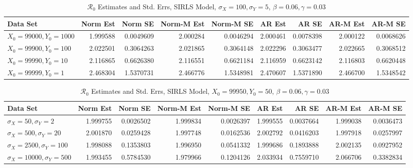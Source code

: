 \message{ !name(draft_v13.tex)}\documentclass[12pt]{article}
\newcommand{\rr}{\ensuremath{\mathcal{R}_0}}
\begin{document}
\begin{table}[H]
	
	\caption{\label{tab:}$\rr$ Estimates and Std. Errs, SIRLS Model,
		$\sigma_X = 100, \sigma_Y = 5$, $\beta = 0.06, \gamma = 0.03$}
	\centering
	\begin{footnotesize}
		\begin{tabular}[t]{l|r|r|r|r|r|r|r|r}
			\hline
			Data Set & Norm Est & Norm SE & Norm-M Est & Norm-M SE & AR Est & AR SE & AR-M Est & AR-M SE\\
			\hline
			$X_0 = 99000, Y_0 = 1000$ & 1.999588 & 0.0049609 & 2.000284 & 0.0046294 & 2.000461 & 0.0078398 & 2.000122 & 0.0068626\\
			\hline
			$X_0 = 99900, Y_0 = 100$ & 2.022501 & 0.3064263 & 2.021865 & 0.3064148 & 2.022296 & 0.3063477 & 2.022665 & 0.3068512\\
			\hline
			$X_0 = 99990, Y_0 = 10$ & 2.116865 & 0.6626380 & 2.116551 & 0.6621184 & 2.116959 & 0.6623142 & 2.116803 & 0.6620448\\
			\hline
			$X_0 = 99999, Y_0 = 1$ & 2.468304 & 1.5370731 & 2.466776 & 1.5348981 & 2.470607 & 1.5371890 & 2.466700 & 1.5348542\\
			\hline
		\end{tabular}
	\end{footnotesize}
\end{table}

\begin{table}[H]
	\caption{\label{tab:}$\rr$ Estimates and Std. Errs, SIRLS Model,
		$X_0 = 99950, Y_0 = 50$, $\beta = 0.06, \gamma = 0.03$}
	\centering
	\begin{footnotesize}
		\begin{tabular}[t]{l|r|r|r|r|r|r|r|r}
			\hline
			Data Set & Norm Est & Norm SE & Norm-M Est & Norm-M SE & AR Est & AR SE & AR-M Est & AR-M SE\\
			\hline
			$\sigma_X = 50, \sigma_Y = 2$ & 1.999755 & 0.0026502 & 1.999834 & 0.0026397 & 1.999555 & 0.0037664 & 1.999038 & 0.0036473\\
			\hline
			$\sigma_X = 500, \sigma_Y = 20$ & 2.001870 & 0.0259428 & 1.997748 & 0.0162536 & 2.002792 & 0.0416203 & 1.997918 & 0.0257997\\
			\hline
			$\sigma_X = 2500, \sigma_Y = 100$ & 1.998088 & 0.1353803 & 1.996950 & 0.0541332 & 1.999686 & 0.1893888 & 2.002135 & 0.0927952\\
			\hline
			$\sigma_X = 10000, \sigma_Y = 500$ & 1.993455 & 0.5784530 & 1.979966 & 0.1204126 & 2.033934 & 0.7559710 & 2.066706 & 0.3382834\\
			\hline
		\end{tabular}
	\end{footnotesize}
\end{table}
\end{document}
